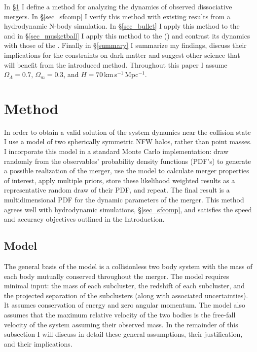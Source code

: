 
In \S\ref{sec_method} I define a method for analyzing the dynamics of observed dissociative mergers.
In \S\ref{sec_sfcomp} I verify this method with existing results from a hydrodynamic N-body simulation.
In \S\ref{sec_bullet} I apply this method to the  and in \S\ref{sec_musketball} I apply this method to the  () and contrast its dynamics with those of the .
Finally in \S \ref{summary} I summarize my findings, discuss their implications for the constraints on dark matter and suggest other science that will benefit from the introduced method.
Throughout this paper I assume $\Omega_{\Lambda}=0.7$, $\Omega_m=0.3$, and $H=70$\,km\,s$^{-1}$\,Mpc$^{-1}$.




\section{Method}\label{sec_method}

In order to obtain a valid solution of the system dynamics near the collision state I use a model of two spherically symmetric NFW halos, rather than point masses.
I incorporate this model in a standard Monte Carlo implementation: draw randomly from the observables' probability density functions (PDF's) to generate a possible realization of the merger, use the model to calculate merger properties of interest, apply multiple priors, store these likelihood weighted results as a representative random draw of their PDF, and repeat.  
The final result is a multidimensional PDF for the dynamic parameters of the merger. 
This method agrees well with hydrodynamic simulations, \S\ref{sec_sfcomp}, and satisfies the speed and accuracy objectives outlined in the Introduction.

\subsection{Model}\label{sec_model}
The general basis of the model is a collisionless two body system with the mass of each body mutually conserved throughout the merger.
The model requires minimal input: the mass of each subcluster, the redshift of each subcluster, and the projected separation of the subclusters (along with associated uncertainties).
It assumes conservation of energy and zero angular momentum.
The model also assumes that the maximum relative velocity of the two bodies is the free-fall velocity of the system assuming their observed mass.
In the remainder of this subsection I will discuss in detail these general assumptions, their justification, and their implications. 


